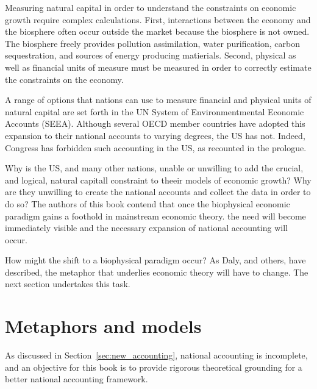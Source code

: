 Measuring natural
capital in order to understand the constraints  on economic growth require  complex calculations. 
First, interactions
between the economy and the biosphere often occur outside the market because 
the biosphere is not owned. The biosphere freely provides pollution assimilation,
water purification, carbon sequestration, and sources of energy producing 
matierials. Second, physical as well as financial units of measure
must be measured in order to correctly estimate the constraints on the 
economy. 

A range of options that nations can use to measure financial and physical 
units of natural capital  are set forth
 in the UN System of Environmentmental Economic Accounts (SEEA). Although
several 
OECD member countries have adopted this expansion to their national
accounts to varying degrees, the US has not. Indeed,  Congress
has forbidden such accounting in the US, as
recounted in the 
prologue. 

Why is the US, and many other nations, unable or unwilling to add the crucial,
and logical, natural capitall constraint to theeir models of economic growth?  
Why are they unwilling to create the national accounts and collect the data in order to do so? The 
authors of this book contend that once the biophysical economic paradigm
gains a foothold in mainstream economic theory. the
need will become immediately visible and the necessary expansion 
of national accounting will occur. 

How might the shift to a biophysical paradigm occur? As Daly, and others, have
described, the metaphor that underlies economic theory will have to change. The 
next section undertakes this task.







\section{Metaphors and models}
\label{sec:metaphors_and_models}

As discussed in Section~\ref{sec:new_accounting}, 
national accounting is incomplete, and
an objective for this book is to provide rigorous theoretical grounding for 
a better national accounting framework.

